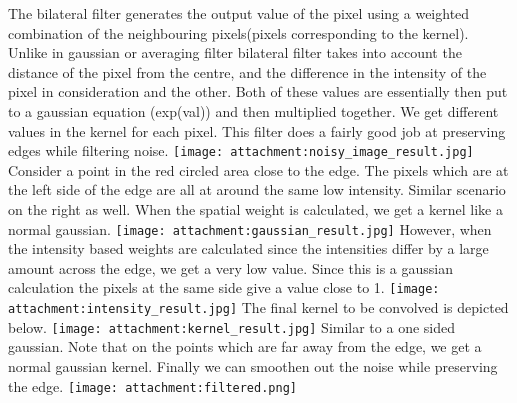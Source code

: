 \documentclass{report}
\makeatletter
\def\maxwidth{\ifdim\Gin@nat@width>\linewidth\linewidth
    \else\Gin@nat@width\fi}
\let\Oldincludegraphics\includegraphics
\renewcommand{\includegraphics}[1]{\Oldincludegraphics[width=.8\maxwidth]{#1}}
\makeatother
\begin{document}
The bilateral filter generates the output value of the pixel using a
weighted combination of the neighbouring pixels(pixels corresponding to
the kernel). Unlike in gaussian or averaging filter bilateral filter
takes into account the distance of the pixel from the centre, and the
difference in the intensity of the pixel in consideration and the other.
Both of these values are essentially then put to a gaussian equation
(exp(val)) and then multiplied together. We get different values in the
kernel for each pixel. This filter does a fairly good job at preserving
edges while filtering noise.
\texttt{[image: attachment:noisy\_image\_result.jpg]} Consider a point in
the red circled area close to the edge. The pixels which are at the left
side of the edge are all at around the same low intensity. Similar
scenario on the right as well. When the spatial weight is calculated, we
get a kernel like a normal gaussian.
\texttt{[image: attachment:gaussian\_result.jpg]} However, when the
intensity based weights are calculated since the intensities differ by a
large amount across the edge, we get a very low value. Since this is a
gaussian calculation the pixels at the same side give a value close to
1. \texttt{[image: attachment:intensity\_result.jpg]} The final kernel to
be convolved is depicted below.
\texttt{[image: attachment:kernel\_result.jpg]} Similar to a one sided
gaussian. Note that on the points which are far away from the edge, we
get a normal gaussian kernel. Finally we can smoothen out the noise
while preserving the edge. \texttt{[image: attachment:filtered.png]}
\end{document}
